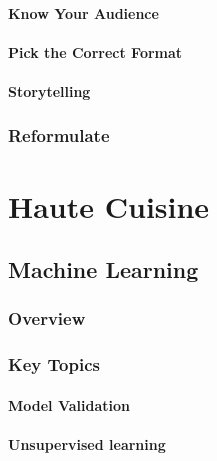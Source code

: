 \documentclass[
]{book}
\begin{document}
\hypertarget{know-your-audience}{%
\subsection{Know Your Audience}\label{know-your-audience}}

\hypertarget{pick-the-correct-format}{%
\subsection{Pick the Correct Format}\label{pick-the-correct-format}}

\hypertarget{storytelling}{%
\subsection{Storytelling}\label{storytelling}}

\hypertarget{reformulate-1}{%
\section{Reformulate}\label{reformulate-1}}

\hypertarget{part-haute-cuisine}{%
\part*{Haute Cuisine}\label{part-haute-cuisine}}

\hypertarget{machine_learning}{%
\chapter{Machine Learning}\label{machine_learning}}

\hypertarget{overview}{%
\section{Overview}\label{overview}}

\hypertarget{key-topics}{%
\section{Key Topics}\label{key-topics}}

\hypertarget{model-validation}{%
\subsection{Model Validation}\label{model-validation}}

\hypertarget{unsupervised-learning}{%
\subsection{Unsupervised learning}\label{unsupervised-learning}}
\end{document}
